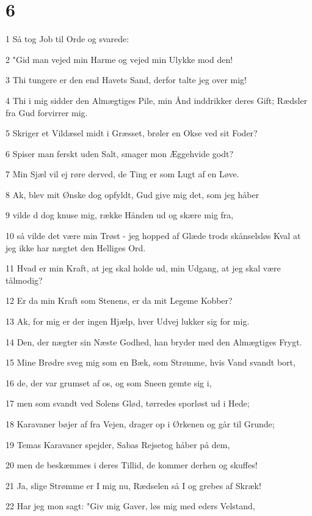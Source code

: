 \chapter{6}

\par 1 Så tog Job til Orde og svarede:
\par 2 "Gid man vejed min Harme og vejed min Ulykke mod den!
\par 3 Thi tungere er den end Havets Sand, derfor talte jeg over mig!
\par 4 Thi i mig sidder den Almægtiges Pile, min Ånd inddrikker deres Gift; Rædsler fra Gud forvirrer mig.
\par 5 Skriger et Vildæsel midt i Græsset, brøler en Okse ved sit Foder?
\par 6 Spiser man ferskt uden Salt, smager mon Æggehvide godt?
\par 7 Min Sjæl vil ej røre derved, de Ting er som Lugt af en Løve.
\par 8 Ak, blev mit Ønske dog opfyldt, Gud give mig det, som jeg håber
\par 9 vilde d dog knuse mig, række Hånden ud og skære mig fra,
\par 10 så vilde det være min Trøst - jeg hopped af Glæde trods skånselsløs Kval at jeg ikke har nægtet den Helliges Ord.
\par 11 Hvad er min Kraft, at jeg skal holde ud, min Udgang, at jeg skal være tålmodig?
\par 12 Er da min Kraft som Stenens, er da mit Legeme Kobber?
\par 13 Ak, for mig er der ingen Hjælp, hver Udvej lukker sig for mig.
\par 14 Den, der nægter sin Næste Godhed, han bryder med den Almægtiges Frygt.
\par 15 Mine Brødre sveg mig som en Bæk, som Strømme, hvis Vand svandt bort,
\par 16 de, der var grumset af os, og som Sneen gemte sig i,
\par 17 men som svandt ved Solens Glød, tørredes sporløst ud i Hede;
\par 18 Karavaner bøjer af fra Vejen, drager op i Ørkenen og går til Grunde;
\par 19 Temas Karavaner spejder, Sabas Rejsetog håber på dem,
\par 20 men de beskæmmes i deres Tillid, de kommer derhen og skuffes!
\par 21 Ja, slige Strømme er I mig nu, Rædselen så I og grebes af Skræk!
\par 22 Har jeg mon sagt: "Giv mig Gaver, løs mig med eders Velstand,
